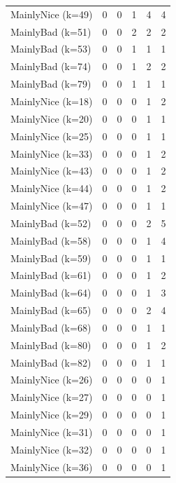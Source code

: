 \documentclass[journal,10pt,twoside]{IEEEtran}
\begin{document}
\begin{table}[ht]
\begin{tabular}{l|ccccc}
		MainlyNice (k=49) &   0 &   0 &    1 &    4 &    4 \\
		MainlyBad (k=51)  &   0 &   0 &    2 &    2 &    2 \\
		MainlyBad (k=53)  &   0 &   0 &    1 &    1 &    1 \\
		MainlyBad (k=74)  &   0 &   0 &    1 &    2 &    2 \\
		MainlyBad (k=79)  &   0 &   0 &    1 &    1 &    1 \\ \midrule
		MainlyNice (k=18) &   0 &   0 &    0 &    1 &    2 \\
		MainlyNice (k=20) &   0 &   0 &    0 &    1 &    1 \\
		MainlyNice (k=25) &   0 &   0 &    0 &    1 &    1 \\
		MainlyNice (k=33) &   0 &   0 &    0 &    1 &    2 \\
		MainlyNice (k=43) &   0 &   0 &    0 &    1 &    2 \\
		MainlyNice (k=44) &   0 &   0 &    0 &    1 &    2 \\
		MainlyNice (k=47) &   0 &   0 &    0 &    1 &    1 \\
		MainlyBad (k=52)  &   0 &   0 &    0 &    2 &    5 \\
		MainlyBad (k=58)  &   0 &   0 &    0 &    1 &    4 \\
		MainlyBad (k=59)  &   0 &   0 &    0 &    1 &    1 \\
		MainlyBad (k=61)  &   0 &   0 &    0 &    1 &    2 \\
		MainlyBad (k=64)  &   0 &   0 &    0 &    1 &    3 \\
		MainlyBad (k=65)  &   0 &   0 &    0 &    2 &    4 \\
		MainlyBad (k=68)  &   0 &   0 &    0 &    1 &    1 \\
		MainlyBad (k=80)  &   0 &   0 &    0 &    1 &    2 \\
		MainlyBad (k=82)  &   0 &   0 &    0 &    1 &    1 \\ \midrule
		MainlyNice (k=26) &   0 &   0 &    0 &    0 &    1 \\
		MainlyNice (k=27) &   0 &   0 &    0 &    0 &    1 \\
		MainlyNice (k=29) &   0 &   0 &    0 &    0 &    1 \\
		MainlyNice (k=31) &   0 &   0 &    0 &    0 &    1 \\
		MainlyNice (k=32) &   0 &   0 &    0 &    0 &    1 \\
		MainlyNice (k=36) &   0 &   0 &    0 &    0 &    1 \\

\end{tabular}
\end{table}
\end{document}
